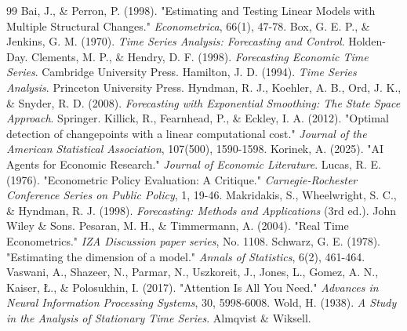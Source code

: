 \documentclass[11pt, a4paper]{report}
\begin{document}
\begin{thebibliography}{99}
 Bai, J., \& Perron, P. (1998). "Estimating and Testing Linear Models with Multiple Structural Changes." \textit{Econometrica}, 66(1), 47-78.
 Box, G. E. P., \& Jenkins, G. M. (1970). \textit{Time Series Analysis: Forecasting and Control}. Holden-Day.
 Clements, M. P., \& Hendry, D. F. (1998). \textit{Forecasting Economic Time Series}. Cambridge University Press.
 Hamilton, J. D. (1994). \textit{Time Series Analysis}. Princeton University Press.
 Hyndman, R. J., Koehler, A. B., Ord, J. K., \& Snyder, R. D. (2008). \textit{Forecasting with Exponential Smoothing: The State Space Approach}. Springer.
 Killick, R., Fearnhead, P., \& Eckley, I. A. (2012). "Optimal detection of changepoints with a linear computational cost." \textit{Journal of the American Statistical Association}, 107(500), 1590-1598.
 Korinek, A. (2025). "AI Agents for Economic Research." \textit{Journal of Economic Literature}.
 Lucas, R. E. (1976). "Econometric Policy Evaluation: A Critique." \textit{Carnegie-Rochester Conference Series on Public Policy}, 1, 19-46.
 Makridakis, S., Wheelwright, S. C., \& Hyndman, R. J. (1998). \textit{Forecasting: Methods and Applications} (3rd ed.). John Wiley \& Sons.
 Pesaran, M. H., \& Timmermann, A. (2004). "Real Time Econometrics." \textit{IZA Discussion paper series}, No. 1108.
 Schwarz, G. E. (1978). "Estimating the dimension of a model." \textit{Annals of Statistics}, 6(2), 461-464.
 Vaswani, A., Shazeer, N., Parmar, N., Uszkoreit, J., Jones, L., Gomez, A. N., Kaiser, \L., \& Polosukhin, I. (2017). "Attention Is All You Need." \textit{Advances in Neural Information Processing Systems}, 30, 5998-6008.
 Wold, H. (1938). \textit{A Study in the Analysis of Stationary Time Series}. Almqvist \& Wiksell.
\end{thebibliography}
\end{document}

